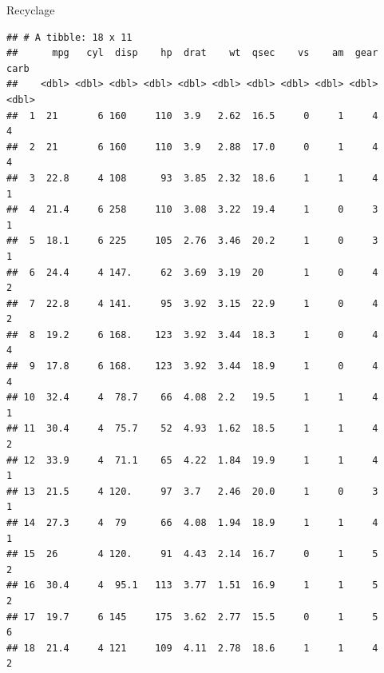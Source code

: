 \documentclass[
  ignorenonframetext,
]{beamer}
\begin{document}
\begin{frame}[fragile]{Recyclage}
\begin{verbatim}
## # A tibble: 18 x 11
##      mpg   cyl  disp    hp  drat    wt  qsec    vs    am  gear  carb
##    <dbl> <dbl> <dbl> <dbl> <dbl> <dbl> <dbl> <dbl> <dbl> <dbl> <dbl>
##  1  21       6 160     110  3.9   2.62  16.5     0     1     4     4
##  2  21       6 160     110  3.9   2.88  17.0     0     1     4     4
##  3  22.8     4 108      93  3.85  2.32  18.6     1     1     4     1
##  4  21.4     6 258     110  3.08  3.22  19.4     1     0     3     1
##  5  18.1     6 225     105  2.76  3.46  20.2     1     0     3     1
##  6  24.4     4 147.     62  3.69  3.19  20       1     0     4     2
##  7  22.8     4 141.     95  3.92  3.15  22.9     1     0     4     2
##  8  19.2     6 168.    123  3.92  3.44  18.3     1     0     4     4
##  9  17.8     6 168.    123  3.92  3.44  18.9     1     0     4     4
## 10  32.4     4  78.7    66  4.08  2.2   19.5     1     1     4     1
## 11  30.4     4  75.7    52  4.93  1.62  18.5     1     1     4     2
## 12  33.9     4  71.1    65  4.22  1.84  19.9     1     1     4     1
## 13  21.5     4 120.     97  3.7   2.46  20.0     1     0     3     1
## 14  27.3     4  79      66  4.08  1.94  18.9     1     1     4     1
## 15  26       4 120.     91  4.43  2.14  16.7     0     1     5     2
## 16  30.4     4  95.1   113  3.77  1.51  16.9     1     1     5     2
## 17  19.7     6 145     175  3.62  2.77  15.5     0     1     5     6
## 18  21.4     4 121     109  4.11  2.78  18.6     1     1     4     2
\end{verbatim}

\normalsize
\end{frame}
\end{document}
